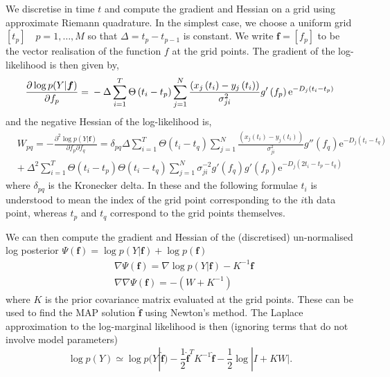 \documentclass[english]{article}
\begin{document}
We discretise in time $t$ and compute the gradient and Hessian on a grid using approximate Riemann quadrature. 
In the simplest case, we
choose a uniform grid $\left[t_p\right]\quad p=1,\ldots,M$ so that $\Delta=t_p-t_{p-1}$ is constant. We
write $\bm f=\left[f_p\right]$ to be the vector realisation of the function
$f$ at the grid points. The gradient of the log-likelihood is then given by,
\begin{equation}
\frac{\partial \log p(Y|\bm f)}{\partial f_p} =\\ 
-\Delta\sum_{i=1}^T \Theta\left(t_i- t_p\right)\sum_{j=1}^N  
\frac{\left(x_j\left(t_i\right) - y_{j}\left(t_i\right)\right)}{\sigma^2_{ji} }g'\left(f_p\right) \mathrm{e}^{-D_j\left(t_i-t_p\right)}\label{funcGrad}
\end{equation}
and the negative Hessian of the log-likelihood is,
\begin{equation}\begin{split}
&W_{pq} = -\frac{\partial^2\log p(Y|\bm f)}{\partial f_p\partial f_q} = \delta_{pq}\Delta  \sum_{i=1}^T
\Theta\left(t_i-t_q\right)\sum_{j=1}^N \frac{\left(x_j\left(t_i\right) - y_{j}\left(t_i\right)\right)}{\sigma^2_{ji} }
g''\left(f_q\right)
 \mathrm{e}^{-D_j\left(t_i-t_q\right)} \\
&+ \:\Delta ^2\sum_{i=1}^T \Theta\left(t_i-t_p\right)\Theta\left(t_i-t_q\right)\sum_{j=1}^N \sigma_{ji}^{-2} 
g'\left(f_q\right) g'\left(f_p\right)
\mathrm{e}^{-D_j\left(2t_i-t_p-t_q\right)} \label{funcHess}
\end{split}\end{equation}
where $\delta_{pq}$ is the Kronecker delta. In these and the following formulae $t_i$ is understood to mean the index of the grid point corresponding to the $i$th data point, whereas $t_p$ and $t_q$ correspond to the grid points themselves.

We can then compute the gradient and Hessian of the (discretised) 
un-normalised log posterior
$\Psi(\bm f) = \log p(Y|\bm f) + \log p(\bm f)$ 
\cite[see][chapter 3]{Rasmussen:book05}
\begin{equation}\begin{split}
&\nabla \Psi(\bm f)  = \nabla \log p(Y|\bm f) -K^{-1}{\bm f} \\
&\nabla\nabla \Psi(\bm f) = - (W + K^{-1})\label{postGrid}
\end{split}\end{equation}
where $K$ is the prior covariance matrix evaluated at the grid points. These 
can be used to find the MAP solution $\hat{\bm f}$ using Newton's method.
The Laplace approximation to the log-marginal likelihood is then 
(ignoring terms that do not involve model parameters)
\begin{equation}
\log p(Y)  \simeq   \log p(Y|\hat{\bm f}) - \mbox{$\frac{1}{2}$}\hat{\bm f}^T K^{-1}
\hat{\bm f} - \mbox{$\frac{1}{2}$}\log|I+KW|. 
\label{eqn_marginal}
\end{equation}
\end{document}
